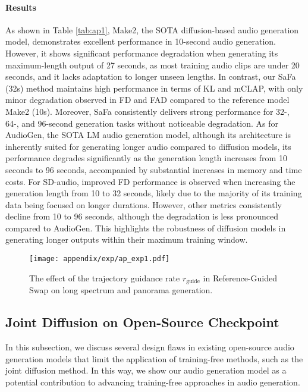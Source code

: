 \paragraph{Results}
As shown in Table \ref{tab:ap1}, Make2, the SOTA diffusion-based audio generation model, demonstrates excellent performance in 10-second audio generation. However, it shows significant performance degradation when generating its maximum-length output of 27 seconds, as most training audio clips are under 20 seconds, and it lacks adaptation to longer unseen lengths. In contrast, our SaFa (32s) method maintains high performance in terms of KL and mCLAP, with only minor degradation observed in FD and FAD compared to the reference model Make2 (10s). Moreover, SaFa consistently delivers strong performance for 32-, 64-, and 96-second generation tasks without noticeable degradation. As for AudioGen, the SOTA LM audio generation model, although its architecture is inherently suited for generating longer audio compared to diffusion models, its performance degrades significantly as the generation length increases from 10 seconds to 96 seconds, accompanied by substantial increases in memory and time costs. For SD-audio, improved FD performance is observed when increasing the generation length from 10 to 32 seconds, likely due to the majority of its training data being focused on longer durations. However, other metrics consistently decline from 10 to 96 seconds, although the degradation is less pronounced compared to AudioGen. This highlights the robustness of diffusion models in generating longer outputs within their maximum training window.

\begin{figure*}[t]
    \centering
    \texttt{[image: appendix/exp/ap\_exp1.pdf]}
    \vspace{-20pt}
    \caption{The effect of the trajectory guidance rate $r_\text{guide}$ in Reference-Guided Swap on long spectrum and panorama generation.}
    \vspace{-10pt}
\label{fig:ap2}
\end{figure*}

\subsection{Joint Diffusion on Open-Source Checkpoint}
In this subsection, we discuss several design flaws in existing open-source audio generation models that limit the application of training-free methods, such as the joint diffusion method. In this way, we show our audio generation model as a potential contribution to advancing training-free approaches in audio generation. 

